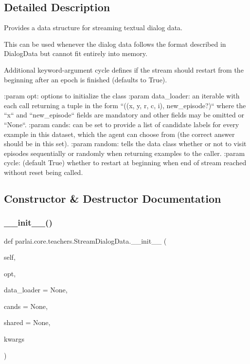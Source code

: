 \subsection{Detailed Description}
\begin{DoxyVerb}Provides a data structure for streaming textual dialog data.

This can be used whenever the dialog data follows the format described in
DialogData but cannot fit entirely into memory.

Additional keyword-argument cycle defines if the stream should restart from
the beginning after an epoch is finished (defaults to True).

:param opt:
    options to initialize the class
:param data_loader:
    an iterable with each call returning a tuple in the form
    ``((x, y, r, c, i), new_episode?)`` where the ``x`` and ``new_episode``
    fields are mandatory and other fields may be omitted or ``None``.
:param cands:
    can be set to provide a list of candidate labels for every example in
    this dataset, which the agent can choose from (the correct answer
    should be in this set).
:param random:
    tells the data class whether or not to visit episodes sequentially or
    randomly when returning examples to the caller.
:param cycle:
    (default True) whether to restart at beginning when end of stream
    reached without reset being called.
\end{DoxyVerb}
 

\subsection{Constructor \& Destructor Documentation}
\mbox{\label{classparlai_1_1core_1_1teachers_1_1StreamDialogData_a72324ec2775d16b31d1d18287a8f84e9}} 
\subsubsection{\texorpdfstring{\+\_\+\+\_\+init\+\_\+\+\_\+()}{\_\_init\_\_()}}
{\footnotesize\ttfamily def parlai.\+core.\+teachers.\+Stream\+Dialog\+Data.\+\_\+\+\_\+init\+\_\+\+\_\+ (\begin{DoxyParamCaption}\item[{}]{self,  }\item[{}]{opt,  }\item[{}]{data\+\_\+loader = {\ttfamily None},  }\item[{}]{cands = {\ttfamily None},  }\item[{}]{shared = {\ttfamily None},  }\item[{}]{kwargs }\end{DoxyParamCaption})}



